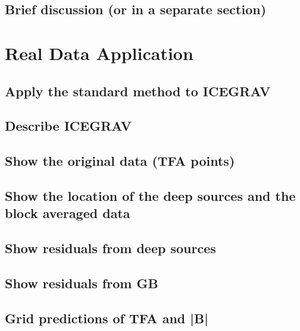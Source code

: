 \subsection{Brief discussion (or in a separate section)}



\section{Real Data Application}

\subsection{Apply the standard method to ICEGRAV}

\subsection{Describe ICEGRAV}

\subsection{Show the original data (TFA points)}

\subsection{Show the location of the deep sources and the block averaged data}

\subsection{Show residuals from deep sources}

\subsection{Show residuals from GB}

\subsection{Grid predictions of TFA and |B|}

